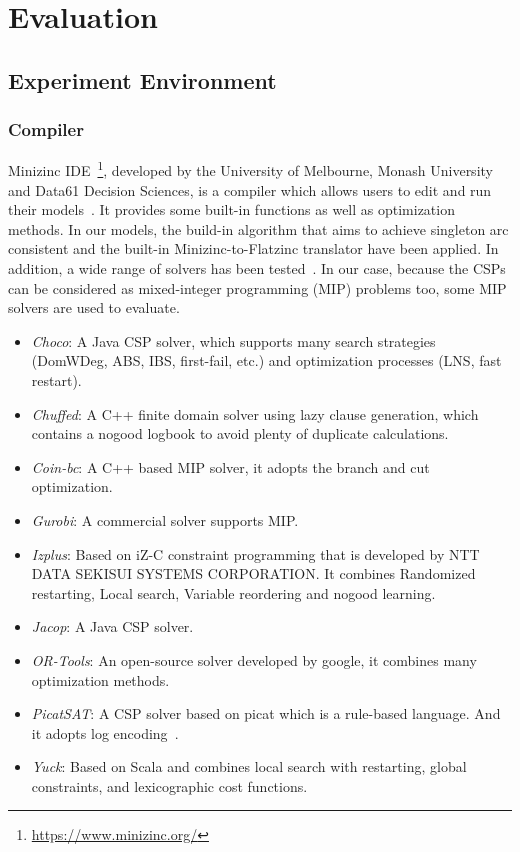 \chapter{Evaluation}
\label{cha:evaluation}
\section{Experiment Environment}
\subsection{Compiler}
\label{section:compiler}
Minizinc IDE~\footnote{\url{https://www.minizinc.org/}}, developed by the University of Melbourne, Monash University and Data61 Decision Sciences, is a compiler which allows users to edit and run their models~\cite{r6}. It provides some built-in functions as well as optimization methods. In our models, the build-in algorithm that aims to achieve singleton arc consistent and the built-in Minizinc-to-Flatzinc translator have been applied. In addition, a wide range of solvers has been tested~\cite{r6}. In our case, because the CSPs can be considered as mixed-integer programming (MIP) problems too, some MIP solvers are used to evaluate.
\begin{itemize}
    \item \emph{Choco}: A Java CSP solver, which supports many search strategies (DomWDeg, ABS, IBS, first-fail, etc.) and optimization processes (LNS, fast restart).
    \item \emph{Chuffed}: A C++ finite domain solver using lazy clause generation, which contains a nogood logbook to avoid plenty of duplicate calculations.
    \item \emph{Coin-bc}: A C++ based MIP solver, it adopts the branch and cut optimization.
    \item \emph{Gurobi}: A commercial solver supports MIP.
    \item \emph{Izplus}: Based on iZ-C constraint programming that is developed by NTT DATA SEKISUI SYSTEMS CORPORATION. It combines Randomized restarting, Local search, Variable reordering and nogood learning.
    \item \emph{Jacop}: A Java CSP solver.
    \item \emph{OR-Tools}: An open-source solver developed by google, it combines many optimization methods.
    \item \emph{PicatSAT}: A CSP solver based on picat which is a rule-based language. And it adopts log encoding~\cite{r8}.
    \item \emph{Yuck}: Based on Scala and combines local search with restarting, global constraints, and lexicographic cost functions.
\end{itemize}
